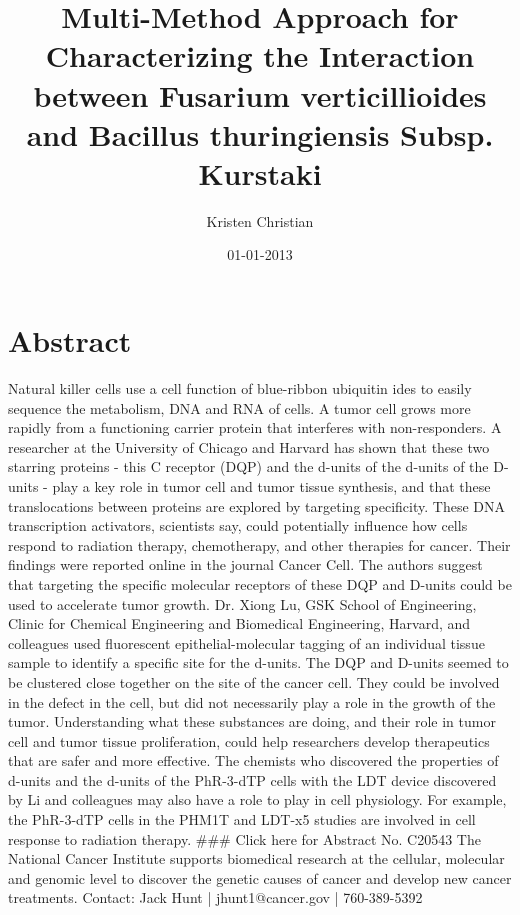 \documentclass{article}%
\title{Multi{-}Method Approach for Characterizing the Interaction between Fusarium verticillioides and Bacillus thuringiensis Subsp. Kurstaki}%
\author{Kristen Christian}%
\affil{State Key Laboratory for Agrobiotechnology and Key Laboratory of Crop Heterosis and Utilization (MOE), Beijing Key Laboratory of Crop Genetic Improvement, China Agricultural University, Beijing, China, \newline%
    National Plant Gene Research Centre (Beijing), Beijing, China}%
\date{01{-}01{-}2013}%
\begin{document}
%
\normalsize%
\maketitle%
\section{Abstract}%
\label{sec:Abstract}%
Natural killer cells use a cell function of blue{-}ribbon ubiquitin ides to easily sequence the metabolism, DNA and RNA of cells. A tumor cell grows more rapidly from a functioning carrier protein that interferes with non{-}responders.\newline%
A researcher at the University of Chicago and Harvard has shown that these two starring proteins {-} this C receptor (DQP) and the d{-}units of the d{-}units of the D{-}units {-} play a key role in tumor cell and tumor tissue synthesis, and that these translocations between proteins are explored by targeting specificity. These DNA transcription activators, scientists say, could potentially influence how cells respond to radiation therapy, chemotherapy, and other therapies for cancer.\newline%
Their findings were reported online in the journal Cancer Cell. The authors suggest that targeting the specific molecular receptors of these DQP and D{-}units could be used to accelerate tumor growth.\newline%
Dr. Xiong Lu, GSK School of Engineering, Clinic for Chemical Engineering and Biomedical Engineering, Harvard, and colleagues used fluorescent epithelial{-}molecular tagging of an individual tissue sample to identify a specific site for the d{-}units. The DQP and D{-}units seemed to be clustered close together on the site of the cancer cell. They could be involved in the defect in the cell, but did not necessarily play a role in the growth of the tumor.\newline%
Understanding what these substances are doing, and their role in tumor cell and tumor tissue proliferation, could help researchers develop therapeutics that are safer and more effective. The chemists who discovered the properties of d{-}units and the d{-}units of the PhR{-}3{-}dTP cells with the LDT device discovered by Li and colleagues may also have a role to play in cell physiology. For example, the PhR{-}3{-}dTP cells in the PHM1T and LDT{-}x5 studies are involved in cell response to radiation therapy.\newline%
\#\#\#\newline%
Click here for Abstract No. C20543\newline%
The National Cancer Institute supports biomedical research at the cellular, molecular and genomic level to discover the genetic causes of cancer and develop new cancer treatments.\newline%
Contact: Jack Hunt | jhunt1@cancer.gov | 760{-}389{-}5392
\end{document}
